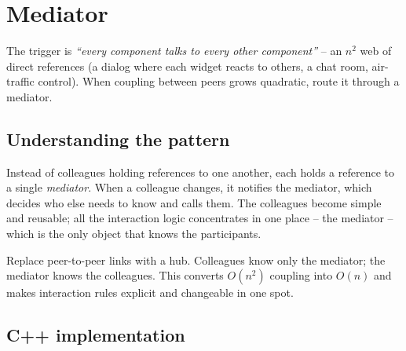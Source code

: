 \section{Mediator}
\label{sec:pat-mediator}


\begin{patternbox}
The trigger is \emph{``every component talks to every other component''} --
an $n^2$ web of direct references (a dialog where each widget reacts to
others, a chat room, air-traffic control). When coupling between peers
grows quadratic, route it through a mediator.
\end{patternbox}

\subsection*{Understanding the pattern}

Instead of colleagues holding references to one another, each holds a
reference to a single \emph{mediator}. When a colleague changes, it
notifies the mediator, which decides who else needs to know and calls
them. The colleagues become simple and reusable; all the interaction logic
concentrates in one place -- the mediator -- which is the only object that
knows the participants.

\begin{ideabox}
Replace peer-to-peer links with a hub. Colleagues know only the mediator;
the mediator knows the colleagues. This converts $O(n^2)$ coupling into
$O(n)$ and makes interaction rules explicit and changeable in one spot.
\end{ideabox}

\subsection*{C++ implementation}

